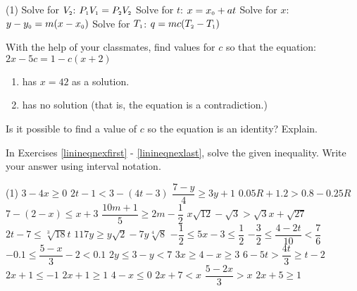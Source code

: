 \begin{tasks}[resume](1)
\task Solve for $V_{\text{\tiny $2$}}$:  $P_{\text{\tiny $1$}}V_{\text{\tiny $1$}} = P_{\text{\tiny $2$}}V_{\text{\tiny $2$}}$  \label{subex1}
\task Solve for $t$:  $x = x_{\text{\tiny $0$}} + at$ 
\task Solve for $x$:   $y-y_{\text{\tiny $0$}} = m(x -x_{\text{\tiny $0$}})$
\task Solve for $T_{\text{\tiny $1$}}$:  $q = mc(T_{\text{\tiny $2$}} -T_{\text{\tiny $1$}})$  \label {subex2} \label{literalexlast}

\task With the help of your classmates, find values for $c$ so that the equation:  $2x - 5c = 1 - c(x+2)$

\begin{enumerate}

\item  has $x = 42$ as a solution.
\item  has no solution (that is, the equation is a contradiction.)

\end{enumerate}
Is it possible to find a value of $c$ so the equation is an identity?  Explain.

\end{tasks}

In Exercises \ref{linineqnexfirst} - \ref{linineqnexlast}, solve the given inequality.  Write your answer using interval notation.

\begin{tasks}[resume](1)
\task $3 - 4x \geq 0$\label{linineqnexfirst}
\task  $2t - 1 < 3 - (4t-3)$
\task  $\dfrac{7 -y}{4} \geq 3y + 1$ 
\task $0.05R + 1.2 > 0.8 - 0.25R$
\task $7 - (2-x) \leq x+3$
\task $\dfrac{10m+1}{5} \geq 2m - \dfrac{1}{2}$ 
\task $x \sqrt{12} - \sqrt{3} > \sqrt{3} x + \sqrt{27}$
\task  $2t - 7 \leq \sqrt[3]{18} t$
\task   $117y \geq y\sqrt{2} - 7y \sqrt[4]{8}$
\task $-\dfrac{1}{2} \leq 5x - 3 \leq \dfrac{1}{2}$
\task $-\dfrac{3}{2} \leq \dfrac{4 - 2t}{10} < \dfrac{7}{6}$
\task $-0.1 \leq \dfrac{5-x}{3} - 2 < 0.1$
\task  $2y \leq 3-y < 7$
\task  $3x \geq 4-x \geq 3$
\task  $6-5t > \dfrac{4t}{3} \geq t - 2$
\task   $2x+1 \leq -1$  $2x+1 \geq 1$ 
\task   $4-x \leq 0$  $2x+7 < x$
\task   $\dfrac{5-2x}{3} > x$  $2x + 5 \geq 1$ \label{linineqnexlast}
\end{tasks}

